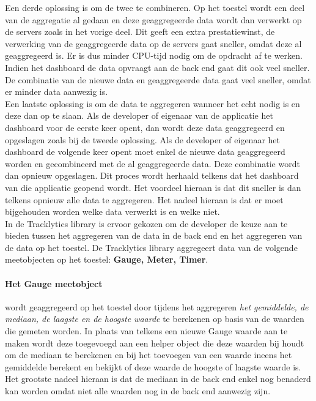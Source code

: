 Een derde oplossing is om de twee te combineren. Op het toestel wordt een deel van de aggregatie al gedaan en deze geaggregeerde data wordt dan verwerkt op de servers zoals in het vorige deel. Dit geeft een extra prestatiewinst, de verwerking van de geaggregeerde data op de servers gaat sneller, omdat deze al geaggregeerd is. Er is dus minder CPU-tijd nodig om de opdracht af te werken. Indien het dashboard de data opvraagt aan de back end gaat dit ook veel sneller. De combinatie van de nieuwe data en geaggregeerde data gaat veel sneller, omdat er minder data aanwezig is. \\

Een laatste oplossing is om de data te aggregeren wanneer het echt nodig is en deze dan op te slaan. Als de developer of eigenaar van de applicatie het dashboard voor de eerste keer opent, dan wordt deze data geaggregeerd en opgeslagen zoals bij de tweede oplossing. Als de developer of eigenaar het dashboard de volgende keer opent moet enkel de nieuwe data geaggregeerd worden en gecombineerd met de al geaggregeerde data. Deze combinatie wordt dan opnieuw opgeslagen. Dit proces wordt herhaald telkens dat het dashboard van die applicatie geopend wordt. Het voordeel hieraan is dat dit sneller is dan telkens opnieuw alle data te aggregeren. Het nadeel hieraan is dat er moet bijgehouden worden welke data verwerkt is en welke niet. \\


In de Tracklytics library is ervoor gekozen om de developer de keuze aan te bieden tussen het aggregeren van de data in de back end en het aggregeren van de data op het toestel. De Tracklytics library aggregeert data van de volgende meetobjecten op het toestel: \textbf{Gauge, Meter, Timer}. \\

\paragraph{Het Gauge meetobject} wordt geaggregeerd op het toestel door tijdens het aggregeren \textit{het gemiddelde, de mediaan, de laagste en de hoogste waarde} te berekenen op basis van de waarden die gemeten worden. In plaats van telkens een nieuwe Gauge waarde aan te maken wordt deze toegevoegd aan een helper object die deze waarden bij houdt om de mediaan te berekenen en bij het toevoegen van een waarde ineens het gemiddelde berekent en bekijkt of deze waarde de hoogste of laagste waarde is. Het grootste nadeel hieraan is dat de mediaan in de back end enkel nog benaderd kan worden omdat niet alle waarden nog in de back end aanwezig zijn. \\

